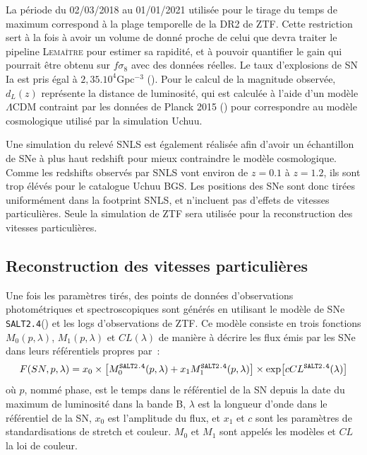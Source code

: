 \documentclass{book}
\def\lemaitre{\textsc{Lemaître}\xspace}
\def\saltd{\texttt{SALT2.4}\xspace}
\begin{document}
La période du 02/03/2018 au 01/01/2021 utilisée pour le tirage du temps de maximum correspond à la plage temporelle de la DR2 de ZTF\cite{rigault_ztf_2024}. Cette restriction sert à la fois à avoir un volume de donné proche de celui que devra traiter le pipeline \lemaitre pour estimer sa rapidité, et à pouvoir quantifier le gain qui pourrait être obtenu sur $f\sigma_8$ avec des données réelles. Le taux d'explosions de SN Ia est pris égal à $2,35 .10^4$Gpc$^{-3}$ (\cite{perley_zwicky_2020}).
Pour le calcul de la magnitude observée, $d_L(z)$ représente la distance de luminosité, qui est calculée à l'aide d'un modèle $\Lambda$CDM contraint par les données de Planck 2015 (\cite{planck_collaboration_planck_2016}) pour correspondre au modèle cosmologique utilisé par la simulation Uchuu.

Une simulation du relevé SNLS est également réalisée afin d'avoir un échantillon de SNe à plus haut redshift pour mieux contraindre le modèle cosmologique. Comme les redshifts observés par SNLS vont environ de $z=0.1$ à $z=1.2$, ils sont trop élévés pour le catalogue Uchuu BGS. Les positions des SNe sont donc tirées uniformément dans la footprint SNLS, et n'incluent pas d'effets de vitesses particulières. Seule la simulation de ZTF sera utilisée pour la reconstruction des vitesses particulières.

\subsection{Reconstruction des vitesses particulières}

Une fois les paramètres tirés, des points de données d'observations photométriques et spectroscopiques sont générés en utilisant le modèle de SNe \saltd (\cite{guy_salt2_2007, rigault_ztf_2024}) et les logs d'observations de ZTF. Ce modèle consiste en trois fonctions $M_0(p, \lambda)$, $M_1(p, \lambda)$ et $CL(\lambda)$ de manière à décrire les flux émis par les SNe dans leurs référentiels propres par~:
\begin{equation}
    F(SN, p, \lambda) = x_0 \times \qty[M^{\saltd}_0(p, \lambda) + x_1 M_1^{\saltd}(p, \lambda)] \times \exp[c CL^{\saltd}(\lambda)]
\end{equation}
où $p$, nommé phase, est le temps dans le référentiel de la SN depuis la date du maximum de luminosité dans la bande B, $\lambda$ est la longueur d'onde dans le référentiel de la SN, $x_0$ est l'amplitude du flux, et $x_1$ et $c$ sont les paramètres de standardisations de stretch et couleur. $M_0$ et $M_1$ sont appelés les modèles et $CL$ la loi de couleur.
\end{document}
